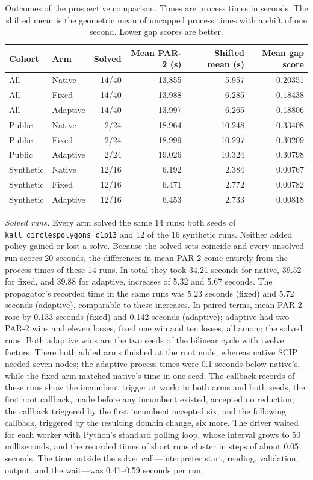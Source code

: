 \begin{table}[htbp]
\centering
\small
\begin{tabular}{@{}llrrrr@{}}
\toprule
Cohort & Arm & Solved & Mean PAR-2 (s) & Shifted mean (s) & Mean gap score\\
\midrule
All & Native & 14/40 & 13.855 & 5.957 & 0.20351\\
All & Fixed & 14/40 & 13.988 & 6.285 & 0.18438\\
All & Adaptive & 14/40 & 13.997 & 6.265 & 0.18806\\
\addlinespace
Public & Native & 2/24 & 18.964 & 10.248 & 0.33408\\
Public & Fixed & 2/24 & 18.999 & 10.297 & 0.30209\\
Public & Adaptive & 2/24 & 19.026 & 10.324 & 0.30798\\
\addlinespace
Synthetic & Native & 12/16 & 6.192 & 2.384 & 0.00767\\
Synthetic & Fixed & 12/16 & 6.471 & 2.772 & 0.00782\\
Synthetic & Adaptive & 12/16 & 6.453 & 2.733 & 0.00818\\
\bottomrule
\end{tabular}
\caption{Outcomes of the prospective comparison. Times are process times in
seconds. The shifted mean is the geometric mean of uncapped process times with
a shift of one second. Lower gap scores are better.}
\label{tab:campaign}
\end{table}

\emph{Solved runs.} Every arm solved the same 14 runs: both seeds of
\texttt{kall\_circlespolygons\_c1p13} and 12 of the 16 synthetic runs. Neither
added policy gained or lost a solve. Because the solved sets coincide and every
unsolved run scores 20 seconds, the differences in mean PAR-2 come entirely from
the process times of these 14 runs. In total they took 34.21 seconds for native,
39.52 for fixed, and 39.88 for adaptive, increases of 5.32 and 5.67 seconds.
The propagator's recorded time in the same runs was 5.23 seconds (fixed) and
5.72 seconds (adaptive), comparable to these increases. In paired terms, mean
PAR-2 rose by 0.133 seconds (fixed) and 0.142 seconds (adaptive);
adaptive had two PAR-2 wins and eleven losses, fixed one win and ten losses, all
among the solved runs. Both adaptive wins are the two seeds of the bilinear
cycle with twelve factors. There both added arms finished at the root node,
whereas native SCIP needed seven nodes; the adaptive process times were 0.1
seconds below native's, while the fixed arm matched native's time in one seed.
The callback records of these runs show the incumbent trigger at work: in both
arms and both seeds, the first root callback, made before any incumbent existed,
accepted no reduction; the callback triggered by the first incumbent accepted
six, and the following callback, triggered by the resulting domain change, six
more. The driver waited for each worker with Python's standard polling loop,
whose interval grows to 50 milliseconds, and the recorded times of short runs
cluster in steps of about 0.05 seconds. The time outside the solver
call---interpreter start, reading, validation, output, and the wait---was
0.41--0.59 seconds per run.

